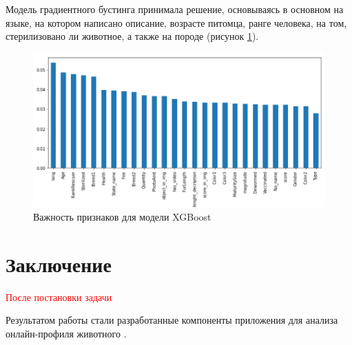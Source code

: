 \documentclass[14pt]{mmcs_article}
\begin{document}
Модель градиентного бустинга принимала решение, основываясь в основном на языке, на котором написано описание, возрасте питомца, ранге человека, на том, стерилизовано ли животное, а также на породе (рисунок \ref{kaggle:boost}).


\begin{figure}[H]
	\centering
	\includegraphics[scale=0.7]{featuresboost.png}
	\caption{Важность признаков для модели XGBoost}\label{kaggle:boost}
\end{figure}


\newpage
{}
\section*{Заключение}

\textcolor{red}{После постановки задачи}

Результатом работы стали разработанные компоненты приложения для анализа онлайн-профиля животного \cite{lib:result}.



\newpage

\renewcommand{\refname}{\centering \textbf{Литература}}
\end{document}
